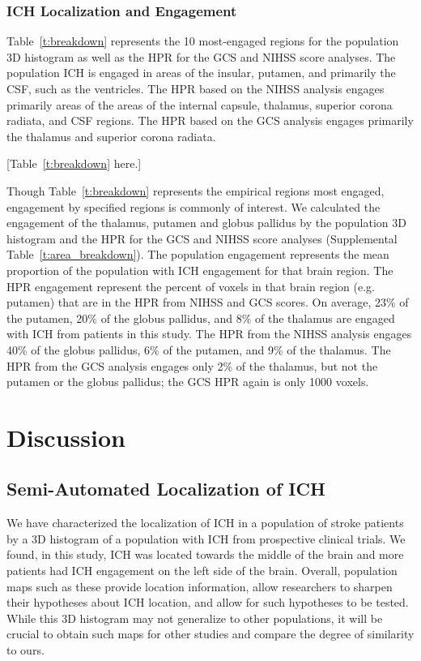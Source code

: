 \documentclass[10pt]{article}\usepackage[]{graphicx}\usepackage[]{color}
\begin{document}
\subsubsection{ICH Localization and Engagement}
Table~\ref{t:breakdown} represents the 10 most-engaged regions for the population 3D histogram as well as the HPR for the GCS and NIHSS score  analyses.  The population ICH is engaged in areas of the insular, putamen, and primarily the CSF, such as the ventricles. The HPR based on the NIHSS analysis engages primarily areas of the areas of the internal capsule, thalamus, superior corona radiata, and CSF regions. The HPR based on the GCS analysis engages primarily the thalamus and superior corona radiata.


[Table~\ref{t:breakdown} here.]

Though Table~\ref{t:breakdown} represents the empirical regions most engaged, engagement by specified regions is commonly of interest.  We calculated the engagement of the thalamus, putamen and globus pallidus by the population 3D histogram and the HPR for the GCS and NIHSS score analyses (Supplemental Table~\ref{t:area_breakdown}).  The population engagement represents the mean proportion of the population with ICH engagement for that brain region. The HPR engagement represent the percent of voxels in that brain region (e.g. putamen) that are in the HPR from NIHSS and GCS scores. On average, 23\% of the putamen, 20\% of the globus pallidus, and 8\% of the thalamus are engaged with ICH from patients in this study. The HPR from the NIHSS analysis engages 40\% of the globus pallidus, 6\% of the putamen, and 9\% of the thalamus. The HPR from the GCS analysis engages only 2\% of the thalamus, but not the putamen or the globus pallidus; the GCS HPR again is only 1000 voxels. 


\section{Discussion}


\subsection{Semi-Automated Localization of ICH}

We have characterized the localization of ICH in a population of stroke patients by a 3D histogram of a population with ICH from prospective clinical trials.  We found, in this study, ICH was located towards the middle of the brain and more patients had ICH engagement on the left side of the brain.  Overall, population maps such as these provide location information, allow researchers to sharpen their hypotheses about ICH location, and allow for such hypotheses to be tested. While this 3D histogram may not generalize to other populations, it will be crucial to obtain such maps for other studies and compare the degree of similarity to ours.  
\end{document}
